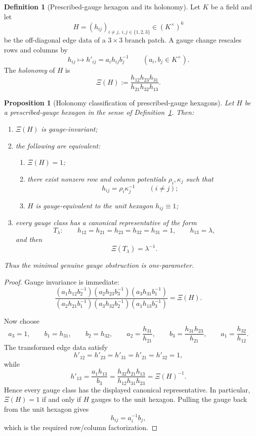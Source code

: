 \documentclass[11pt]{article}
\newtheorem{proposition}[theorem]{Proposition}
\theoremstyle{definition}
\newtheorem{definition}[theorem]{Definition}
\newcommand{\1}{\mathbf{1}}
\begin{document}
\begin{definition}[Prescribed-gauge hexagon and its holonomy]\label{def:555-hexagon}
Let $K$ be a field and let
\[
H=(h_{ij})_{i\neq j,\ i,j\in\{1,2,3\}}
\in (K^\times)^6
\]
be the off-diagonal edge data of a $3\times 3$ branch patch. A gauge change rescales rows and columns by
\[
h_{ij}\longmapsto h'_{ij}=a_i h_{ij} b_j^{-1}
\qquad (a_i,b_j\in K^\times).
\]
The \emph{holonomy} of $H$ is
\[
\Xi(H):=\frac{h_{12}h_{23}h_{31}}{h_{21}h_{32}h_{13}}.
\]
\end{definition}

\begin{proposition}[Holonomy classification of prescribed-gauge hexagons]\label{prop:555-hexagon-holonomy}
Let $H$ be a prescribed-gauge hexagon in the sense of Definition~\ref{def:555-hexagon}. Then:
\begin{enumerate}[label=(\roman*),leftmargin=2.2em]
\item $\Xi(H)$ is gauge-invariant;
\item the following are equivalent:
\begin{enumerate}[label=(\alph*),leftmargin=2.2em]
\item $\Xi(H)=1$;
\item there exist nonzero row and column potentials $\rho_i,\kappa_j$ such that
\[
h_{ij}=\rho_i\kappa_j^{-1}
\qquad (i\neq j);
\]
\item $H$ is gauge-equivalent to the unit hexagon $h_{ij}\equiv 1$;
\end{enumerate}
\item every gauge class has a canonical representative of the form
\[
T_\lambda:\qquad
h_{12}=h_{21}=h_{23}=h_{32}=h_{31}=1,
\qquad
h_{13}=\lambda,
\]
and then
\[
\Xi(T_\lambda)=\lambda^{-1}.
\]
\end{enumerate}
Thus the minimal genuine gauge obstruction is one-parameter.
\end{proposition}

\begin{proof}
Gauge invariance is immediate:
\[
\frac{(a_1h_{12}b_2^{-1})(a_2h_{23}b_3^{-1})(a_3h_{31}b_1^{-1})}
{(a_2h_{21}b_1^{-1})(a_3h_{32}b_2^{-1})(a_1h_{13}b_3^{-1})}
=
\Xi(H).
\]

Now choose
\[
a_3=1,\qquad
b_1=h_{31},\qquad
b_2=h_{32},\qquad
a_2=\frac{h_{31}}{h_{21}},\qquad
b_3=\frac{h_{31}h_{23}}{h_{21}},\qquad
a_1=\frac{h_{32}}{h_{12}}.
\]
The transformed edge data satisfy
\[
h'_{12}=h'_{23}=h'_{31}=h'_{21}=h'_{32}=1,
\]
while
\[
h'_{13}
=
\frac{a_1h_{13}}{b_3}
=
\frac{h_{32}h_{21}h_{13}}{h_{12}h_{31}h_{23}}
=
\Xi(H)^{-1}.
\]
Hence every gauge class has the displayed canonical representative. In particular, $\Xi(H)=1$ if and only if $H$ gauges to the unit hexagon. Pulling the gauge back from the unit hexagon gives
\[
h_{ij}=a_i^{-1}b_j,
\]
which is the required row/column factorization.
\end{proof}
\end{document}
